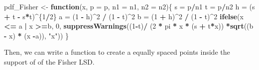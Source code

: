 \documentclass[
]{article}
\newenvironment{Shaded}{\begin{snugshade}}{\end{snugshade}}
\newcommand{\AttributeTok}[1]{\textcolor[rgb]{0.13,0.29,0.53}{#1}}
\newcommand{\ControlFlowTok}[1]{\textcolor[rgb]{0.13,0.29,0.53}{\textbf{#1}}}
\newcommand{\DecValTok}[1]{\textcolor[rgb]{0.00,0.00,0.81}{#1}}
\newcommand{\FunctionTok}[1]{\textcolor[rgb]{0.13,0.29,0.53}{\textbf{#1}}}
\newcommand{\NormalTok}[1]{#1}
\newcommand{\OtherTok}[1]{\textcolor[rgb]{0.56,0.35,0.01}{#1}}
\newcommand{\SpecialCharTok}[1]{\textcolor[rgb]{0.81,0.36,0.00}{\textbf{#1}}}
\newcommand{\StringTok}[1]{\textcolor[rgb]{0.31,0.60,0.02}{#1}}
\begin{document}
\begin{Shaded}
\begin{Highlighting}[]
\NormalTok{pdf\_Fisher }\OtherTok{\textless{}{-}} \ControlFlowTok{function}\NormalTok{(x, }\AttributeTok{p =}\NormalTok{ p, }\AttributeTok{n1 =}\NormalTok{ n1, }\AttributeTok{n2 =}\NormalTok{ n2)\{}
\NormalTok{  s }\OtherTok{=}\NormalTok{ p}\SpecialCharTok{/}\NormalTok{n1}
\NormalTok{  t }\OtherTok{=}\NormalTok{ p}\SpecialCharTok{/}\NormalTok{n2}
\NormalTok{  h }\OtherTok{=}\NormalTok{ (s }\SpecialCharTok{+}\NormalTok{ t }\SpecialCharTok{{-}}\NormalTok{ s}\SpecialCharTok{*}\NormalTok{t)}\SpecialCharTok{\^{}}\NormalTok{\{}\DecValTok{1}\SpecialCharTok{/}\DecValTok{2}\NormalTok{\}}
\NormalTok{  a }\OtherTok{=}\NormalTok{ (}\DecValTok{1} \SpecialCharTok{{-}}\NormalTok{ h)}\SpecialCharTok{\^{}}\DecValTok{2} \SpecialCharTok{/}\NormalTok{ (}\DecValTok{1} \SpecialCharTok{{-}}\NormalTok{ t)}\SpecialCharTok{\^{}}\DecValTok{2}
\NormalTok{  b }\OtherTok{=}\NormalTok{ (}\DecValTok{1} \SpecialCharTok{+}\NormalTok{ h)}\SpecialCharTok{\^{}}\DecValTok{2} \SpecialCharTok{/}\NormalTok{ (}\DecValTok{1} \SpecialCharTok{{-}}\NormalTok{ t)}\SpecialCharTok{\^{}}\DecValTok{2}
  \FunctionTok{ifelse}\NormalTok{(x }\SpecialCharTok{\textless{}=}\NormalTok{ a }\SpecialCharTok{|}\NormalTok{ x }\SpecialCharTok{\textgreater{}=}\NormalTok{b, }\DecValTok{0}\NormalTok{, }\FunctionTok{suppressWarnings}\NormalTok{((}\DecValTok{1}\SpecialCharTok{{-}}\NormalTok{t)}\SpecialCharTok{/}\NormalTok{ (}\DecValTok{2} \SpecialCharTok{*}\NormalTok{ pi }\SpecialCharTok{*}\NormalTok{ x }\SpecialCharTok{*}\NormalTok{ (s }\SpecialCharTok{+}\NormalTok{ t}\SpecialCharTok{*}\NormalTok{x)) }\SpecialCharTok{*}\FunctionTok{sqrt}\NormalTok{((b }\SpecialCharTok{{-}}\NormalTok{ x) }\SpecialCharTok{*}\NormalTok{ (x }\SpecialCharTok{{-}}\NormalTok{a)), }\StringTok{"x"}\NormalTok{))}
\NormalTok{\}}
\end{Highlighting}
\end{Shaded}

Then, we can write a function to create a equally spaced points inside
the support of of the Fisher LSD.
\end{document}
